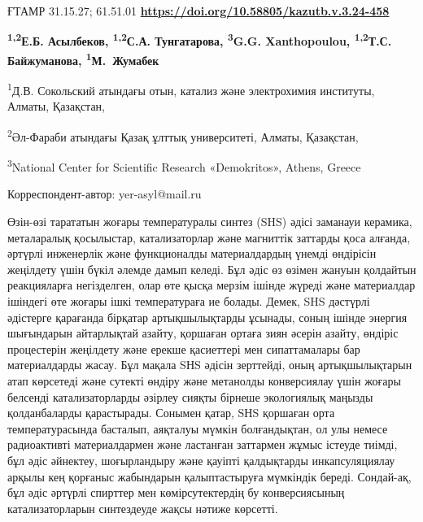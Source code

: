 \newpage
ҒТАМР 31.15.27; 61.51.01
\hfill {\bfseries \href{https://doi.org/10.58805/kazutb.v.3.24-458}{https://doi.org/10.58805/kazutb.v.3.24-458}}


\begin{center}
{\bfseries \textsuperscript{1,2}Е.Б. Асылбеков\envelope, \textsuperscript{1,2}С.А. Тунгатарова, \textsuperscript{3}G.G. Xanthopoulou, \textsuperscript{1,2}Т.С. Байжуманова, \textsuperscript{1}М.~Жумабек}

\textsuperscript{1}Д.В. Сокольский атындағы отын, катализ және
электрохимия институты, Алматы, Қазақстан,

\textsuperscript{2}Әл-Фараби атындағы Қазақ ұлттық университеті, Алматы,
Қазақстан,

\textsuperscript{3}National Center for Scientific Research «Demokritos»,
Athens, Greece
\end{center}
\envelope Корреспондент-автор: yer-asyl@mail.ru


Өзін-өзі тарататын жоғары температуралы синтез (SHS) әдісі заманауи
керамика, металаралық қосылыстар, катализаторлар және магниттік заттарды
қоса алғанда, әртүрлі инженерлік және функционалды материалдардың үнемді
өндірісін жеңілдету үшін бүкіл әлемде дамып келеді. Бұл әдіс өз өзімен
жануын қолдайтын реакцияларға негізделген, олар өте қысқа мерзім ішінде
жүреді және материалдар ішіндегі өте жоғары ішкі температураға ие
болады. Демек, SHS дәстүрлі әдістерге қарағанда бірқатар артықшылықтарды
ұсынады, соның ішінде энергия шығындарын айтарлықтай азайту, қоршаған
ортаға зиян әсерін азайту, өндіріс процестерін жеңілдету және ерекше
қасиеттері мен сипаттамалары бар материалдарды жасау. Бұл мақала SНS
әдісін зерттейді, оның артықшылықтарын атап көрсетеді және сутекті
өндіру және метанолды конверсиялау үшін жоғары белсенді катализаторларды
әзірлеу сияқты бірнеше экологиялық маңызды қолданбаларды қарастырады.
Сонымен қатар, SНS қоршаған орта температурасында басталып, аяқталуы
мүмкін болғандықтан, ол улы немесе радиоактивті материалдармен және
ластанған заттармен жұмыс істеуде тиімді, бұл әдіс әйнектеу,
шоғырландыру және қауіпті қалдықтарды инкапсуляциялау арқылы кең
қорғаныс жабындарын қалыптастыруға мүмкіндік береді. Сондай-ақ, бұл әдіс
әртүрлі спирттер мен көмірсутектердің бу конверсиясының катализаторларын
синтездеуде жақсы нәтиже көрсетті.

